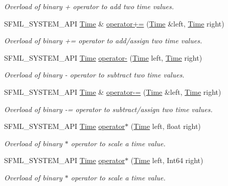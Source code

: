 \begin{DoxyCompactItemize}
\begin{DoxyCompactList}\small\item\em Overload of binary + operator to add two time values. \end{DoxyCompactList}\item 
S\+F\+M\+L\+\_\+\+S\+Y\+S\+T\+E\+M\+\_\+\+A\+PI \hyperlink{classsf_1_1Time}{Time} \& \hyperlink{classsf_1_1Time_a831c8df4b7b9b47eaa0c5a52a1be654c}{operator+=} (\hyperlink{classsf_1_1Time}{Time} \&left, \hyperlink{classsf_1_1Time}{Time} right)
\begin{DoxyCompactList}\small\item\em Overload of binary += operator to add/assign two time values. \end{DoxyCompactList}\item 
S\+F\+M\+L\+\_\+\+S\+Y\+S\+T\+E\+M\+\_\+\+A\+PI \hyperlink{classsf_1_1Time}{Time} \hyperlink{classsf_1_1Time_ace92ab9bc7aec80239af7218cd89cc80}{operator-\/} (\hyperlink{classsf_1_1Time}{Time} left, \hyperlink{classsf_1_1Time}{Time} right)
\begin{DoxyCompactList}\small\item\em Overload of binary -\/ operator to subtract two time values. \end{DoxyCompactList}\item 
S\+F\+M\+L\+\_\+\+S\+Y\+S\+T\+E\+M\+\_\+\+A\+PI \hyperlink{classsf_1_1Time}{Time} \& \hyperlink{classsf_1_1Time_aaf7888302cf4847f97cfc26875367b94}{operator-\/=} (\hyperlink{classsf_1_1Time}{Time} \&left, \hyperlink{classsf_1_1Time}{Time} right)
\begin{DoxyCompactList}\small\item\em Overload of binary -\/= operator to subtract/assign two time values. \end{DoxyCompactList}\item 
S\+F\+M\+L\+\_\+\+S\+Y\+S\+T\+E\+M\+\_\+\+A\+PI \hyperlink{classsf_1_1Time}{Time} \hyperlink{classsf_1_1Time_ac1386c6360872d354b9b59eadcd9778d}{operator$\ast$} (\hyperlink{classsf_1_1Time}{Time} left, float right)
\begin{DoxyCompactList}\small\item\em Overload of binary $\ast$ operator to scale a time value. \end{DoxyCompactList}\item 
S\+F\+M\+L\+\_\+\+S\+Y\+S\+T\+E\+M\+\_\+\+A\+PI \hyperlink{classsf_1_1Time}{Time} \hyperlink{classsf_1_1Time_acd021b3ebb108053d7dec56869e27385}{operator$\ast$} (\hyperlink{classsf_1_1Time}{Time} left, Int64 right)
\begin{DoxyCompactList}\small\item\em Overload of binary $\ast$ operator to scale a time value. \end{DoxyCompactList}\item 

\end{DoxyCompactItemize}
